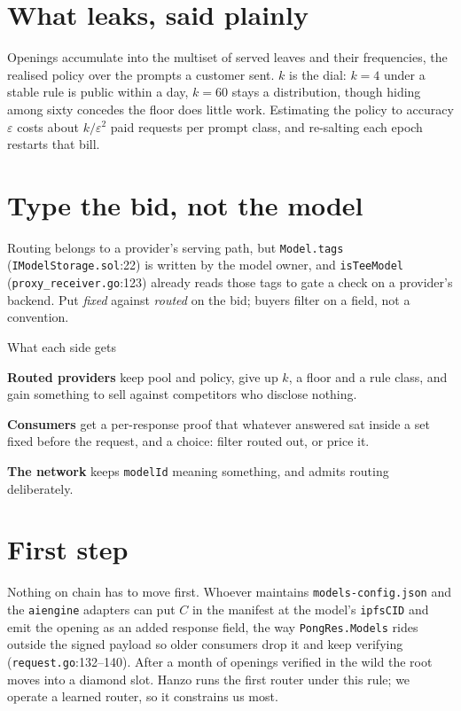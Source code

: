 \documentclass[10pt,a4paper]{article}
\begin{document}
\section*{What leaks, said plainly}

Openings accumulate into the multiset of served leaves and their frequencies, the realised policy
over the prompts a customer sent. $k$ is the dial: $k=4$ under a stable rule is public within a
day, $k=60$ stays a distribution, though hiding among sixty concedes the floor does little work. Estimating the policy to accuracy $\varepsilon$ costs about $k/\varepsilon^{2}$ paid
requests per prompt class, and re-salting each epoch restarts that bill.

\section*{Type the bid, not the model}

Routing belongs to a provider's serving path, but \texttt{Model.tags}
(\texttt{IModelStorage.sol}:22) is written by the model owner, and \texttt{isTeeModel}
(\texttt{proxy\_receiver.go}:123) already reads those tags to gate a check on a provider's backend.
Put \emph{fixed} against \emph{routed} on the bid; buyers filter on a field, not a convention.

\begin{stake}{What each side gets}
\item \textbf{Routed providers} keep pool and policy, give up $k$, a floor and a rule class, and
gain something to sell against competitors who disclose nothing.
\item \textbf{Consumers} get a per-response proof that whatever answered sat inside a set fixed
before the request, and a choice: filter routed out, or price it.
\item \textbf{The network} keeps \texttt{modelId} meaning something, and admits routing
deliberately.
\end{stake}

\section*{First step}

Nothing on chain has to move first. Whoever maintains \texttt{models-config.json} and the
\texttt{aiengine} adapters can put $C$ in the manifest at the model's \texttt{ipfsCID} and emit the
opening as an added response field, the way \texttt{PongRes.Models} rides outside the signed
payload so older consumers drop it and keep verifying (\texttt{request.go}:132--140). After a month
of openings verified in the wild the root moves into a diamond slot. Hanzo runs the first router
under this rule; we operate a learned router, so it constrains us most.
\end{document}
